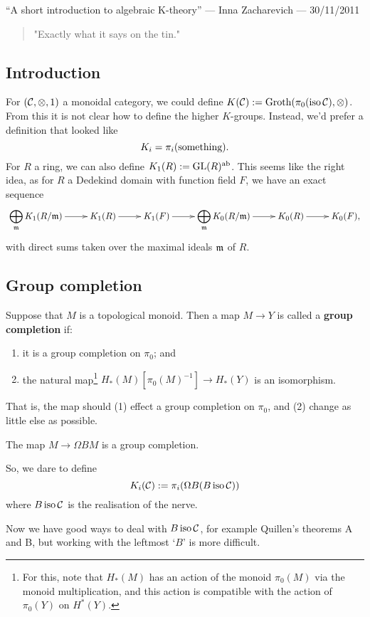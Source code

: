 \begin{InnaKTheory}
\KanSemResponse
{``A short introduction to algebraic K-theory'' --- Inna Zacharevich --- 30/11/2011}
\begin{abstract}
"Exactly what it says on the tin."
\end{abstract}

\subsection*{Introduction}
For $(\mathcal{C},\otimes,1)$ a monoidal category, we could define $K(\mathcal{C}):=\textup{Groth}(\pi_0(\textup{iso\,}\mathcal{C}),\otimes)$. From this it is not clear how to define the higher $K$-groups. Instead, we'd prefer a definition that looked like
\[K_i=\pi_i(\textup{something}).\]
For $R$ a ring, we can also define $K_1(R):=\textup{GL}(R)^{\textup{ab}}$. This seems like the right idea, as for $R$ a Dedekind domain with function field $F$, we have an exact sequence
\[\xymatrix{
\displaystyle\bigoplus_{\frakm}K_1(R/\frakm)\ar[r]&
K_1(R)\ar[r]&
K_1(F)\ar[r]&
\displaystyle\bigoplus_{\frakm}K_0(R/\frakm)\ar[r]&
K_0(R)\ar[r]&
K_0(F),}\]
with direct sums taken over the maximal ideals $\mathfrak{m}$ of $R$.
\subsection*{Group completion}
Suppose that $M$ is a topological monoid. Then a map $M\to Y$ is called a \textbf{group completion} if:
\begin{enumerate}\squishlist
\item it is a group completion on $\pi_0$; and
\item the natural map\footnote{For this, note that $H_*(M)$ has an action of the monoid $\pi_0(M)$ via the monoid multiplication, and this action is compatible with the action of $\pi_0(Y)$ on $H^{*}(Y)$.} $H_*(M)[\pi_0(M)^{-1}]\overset{}{\to} H_*(Y)$ is an isomorphism.
\end{enumerate}
That is, the map should (1) effect a group completion on $\pi_0$, and (2) change as little else as possible.
\begin{thm*}
The map $M\to\Omega BM$ is a group completion.
\end{thm*}
\noindent So, we dare to define
\[K_i(\mathcal{C}):=\pi_i(\Omega B(B\textup{\,iso\,}\mathcal{C}))\]
where $B\textup{\,iso\,}\mathcal{C}$ is the realisation of the nerve.

Now we have good ways to deal with $B\,\textup{iso}\,\mathcal{C}$, for example Quillen's theorems A and B, but working with the leftmost `$B$' is more difficult.


\end{InnaKTheory}
